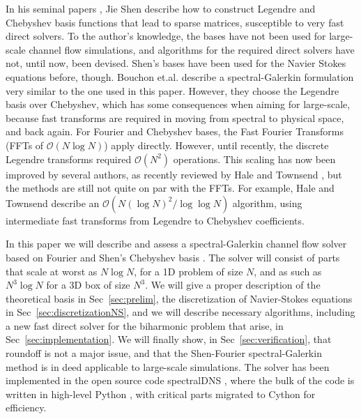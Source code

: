 \documentclass[preprint]{elsarticle}
\begin{document}
In his seminal papers \cite{Shen94,Shen95}, Jie Shen describe how to construct Legendre and Chebyshev basis functions that lead to sparse matrices, susceptible to very fast direct solvers. To the author's knowledge, the bases have not been used for large-scale channel flow simulations, and algorithms for the required direct solvers have not, until now, been devised. Shen's bases have been used for the Navier Stokes equations before, though. Bouchon et.al.  \cite{Bouchon01} describe a spectral-Galerkin formulation very similar to the one used in this paper. However, they choose the Legendre basis over Chebyshev, which has some consequences when aiming for large-scale, because fast transforms are required in moving from spectral to physical space, and back again. For Fourier and Chebyshev bases, the Fast Fourier Transforms (FFTs of $\mathcal{O} (N \log N)$) apply directly. However, until recently, the discrete Legendre transforms required $\mathcal{O}(N^2)$ operations. This scaling has now been improved by several authors, as recently reviewed by Hale and Townsend \cite{Hale14, Hale2015}, but the methods are still not quite on par with the FFTs. For example, Hale and Townsend describe an $\mathcal{O}(N (\log N)^2 / \log \log N)$ algorithm, using intermediate fast transforms from Legendre to Chebyshev coefficients.

In this paper we will describe and assess a spectral-Galerkin channel flow solver based on Fourier and Shen's Chebyshev basis \cite{Shen95}. The solver will consist of parts that scale at worst as $N \log N$, for a 1D problem of size $N$, and as such as $N^3 \log N$ for a 3D box of size $N^3$. We will give a proper description of the theoretical basis in Sec~\ref{sec:prelim}, the discretization of Navier-Stokes equations in Sec~\ref{sec:discretizationNS}, and we will describe necessary algorithms, including a new fast direct solver for the biharmonic problem that arise, in Sec~\ref{sec:implementation}. We will finally show, in Sec~\ref{sec:verification}, that roundoff is not a major issue, and that the Shen-Fourier spectral-Galerkin method is in deed applicable to large-scale simulations. The solver has been implemented in the open source code spectralDNS \cite{spectralDNS}, where the bulk of the code is written in high-level Python \cite{python}, with critical parts migrated to Cython \cite{cython} for efficiency.
\end{document}
